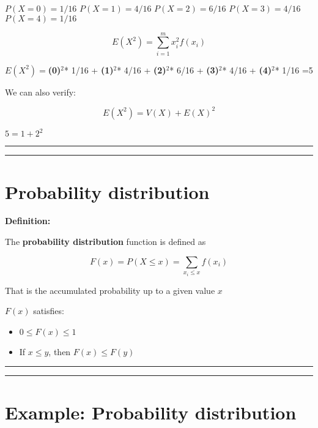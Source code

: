 \documentclass[
]{book}
\providecommand{\tightlist}{%
  \setlength{\itemsep}{0pt}\setlength{\parskip}{0pt}}
\begin{document}
\(P(X=0)=1/16\)
\(P(X=1)=4/16\)
\(P(X=2)=6/16\)
\(P(X=3)=4/16\)
\(P(X=4)=1/16\)

\[E(X^2) =\sum_{i=1}^m x_i^2 f(x_i)\]

\(E(X^2)=\)\textbf{(0)}\(^2\)* 1/16 + \textbf{(1)}\(^2\)* 4/16 + \textbf{(2)}\(^2\)* 6/16 + \textbf{(3)}\(^2\)* 4/16 + \textbf{(4)}\(^2\)* 1/16 =5

We can also verify:

\[E(X^2)=V(X)+E(X)^2\]

\(5=1+2^2\)

\begin{center}\rule{0.5\linewidth}{0.5pt}\end{center}

\begin{center}\rule{0.5\linewidth}{0.5pt}\end{center}

\hypertarget{probability-distribution}{%
\section{Probability distribution}\label{probability-distribution}}

\textbf{Definition:}

The \textbf{probability distribution} function is defined as

\[F(x)=P(X\leq x)=\sum_{x_i\leq x} f(x_i) \]

That is the accumulated probability up to a given value \(x\)

\(F(x)\) satisfies:

\begin{itemize}
\tightlist
\item
  \(0\leq F(x) \leq 1\)
\item
  If \(x \leq y\), then \(F(x) \leq F(y)\)
\end{itemize}

\begin{center}\rule{0.5\linewidth}{0.5pt}\end{center}

\begin{center}\rule{0.5\linewidth}{0.5pt}\end{center}

\hypertarget{example-probability-distribution}{%
\section{Example: Probability distribution}\label{example-probability-distribution}}
\end{document}
